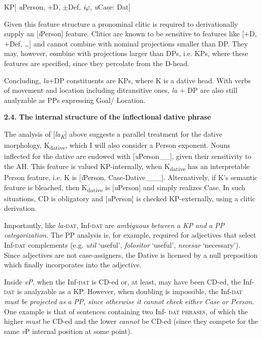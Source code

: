 \documentclass[output=paper,colorlinks,citecolor=brown]{./langscibook}
\begin{document}
          KP[ \textit{u}Person, +D, ${\pm}$Def, \textit{i}${\varphi}$, \textit{u}Case: Dat]

Given this feature structure a pronominal clitic is required to derivationally supply an [\textit{i}Person] feature. Clitics are known to be sensitive to features like [+D, +Def, …] and cannot combine with nominal projections smaller than DP. They may, however, combine with projections larger than DPs, i.e. KPs, where these features are specified, since they percolate from the D-head. 

Concluding, \textit{la}+DP constituents are KPs, where K is a dative head. With verbs of movement and location including ditransitive ones, \textit{la} + DP are also still analyzable as PPs expressing Goal/ Location.

\textbf{2.4.} \textbf{The} \textbf{internal} \textbf{structure} \textbf{of} \textbf{the} \textbf{inflectional} \textbf{dative} \textbf{phrase}

The analysis of [\textit{la\textsubscript{K}}] above suggests a parallel treatment for the dative morphology, K\textsubscript{dative}, which I will also consider a Person exponent. Nouns inflected for the dative are endowed with [\textit{u}Person\_\_], given their sensitivity to the AH. This feature is valued KP-internally, when K\textsubscript{dative} has an interpretable Person feature, i.e. K is [\textit{i}Person, Case-Dative\_\_\_]. Alternatively, if K’s semantic feature is bleached, then K\textsubscript{dative} is [\textit{u}Person] and simply realizes Case. In such situations, CD is obligatory and [\textit{u}Person] is checked KP-externally, using a clitic derivation. 

Importantly, like \textit{la-}\textsc{dat}, Inf-\textsc{dat} are \textit{ambiguous} \textit{between} \textit{a} \textit{KP} \textit{and} \textit{a} \textit{PP} \textit{categorization}. The PP analysis is, for example, required for adjectives that select Inf-\textsc{dat} complements (e.g. \textit{util} ‘useful’, \textit{folositor} ‘useful’, \textit{necesar} ‘necessary’). Since adjectives are not case-assigners, the Dative is licensed by a null preposition which finally incorporates into the adjective.

Inside \textit{vP}, when the Inf-\textsc{dat} is CD-ed or, at least, may have been CD-ed, the Inf-\textsc{dat} is analyzable as a KP. However, when doubling is impossible, the Inf-\textsc{dat} \textit{must} \textit{be} \textit{projected} \textit{as} \textit{a} \textit{PP,} \textit{since} \textit{otherwise} \textit{it} \textit{cannot} \textit{check} \textit{either} \textit{Case} \textit{or} \textit{Person}. One example is that of sentences containing two Inf- \textsc{dat} \textsc{phrases}, of which the higher \textit{must} be CD-ed and the lower \textit{cannot} be CD-ed (since they compete for the same \textit{v}P internal position at some point).
\end{document}
